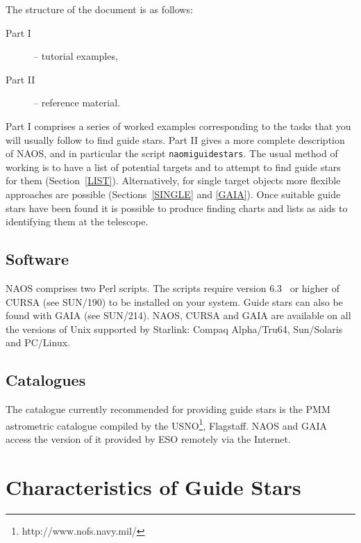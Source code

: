 \documentclass[twoside,11pt]{article}
\newcommand{\CURSAversion}{6.3~}
\newcommand{\htmladdnormallinkfoot}[2]{#1\footnote{#2}}
\newcommand{\xref}[3]{#1}
\newcommand{\xlabel}[1]{}
\renewcommand{\_}{\texttt{\symbol{95}}}
\begin{document}
The structure of the document is as follows:

\begin{description}

  \item[{\rm Part I}] -- tutorial examples,

  \item[{\rm Part II}] -- reference material.

\end{description}

Part I comprises a series of worked examples corresponding to the
tasks that you will usually follow to find guide stars.  Part II gives
a more complete description of NAOS, and in particular the script
{\tt naomiguidestars}.  
The usual method of working is to have a list of potential targets and
to attempt to find guide stars for them (Section~\ref{LIST}).
Alternatively, for single target objects more flexible approaches
are possible (Sections~\ref{SINGLE} and \ref{GAIA}).  Once suitable guide
stars have been found it is possible to produce finding charts and lists
as aids to identifying them at the telescope.

\subsection{Software}

NAOS comprises two Perl scripts.  The scripts require version \CURSAversion
or higher of CURSA (see \xref{SUN/190}{sun190}{}\cite{SUN190}) to be
installed on your system.  Guide stars can also be found with GAIA (see
\xref{SUN/214}{sun214}{}\cite{SUN214}).  NAOS, CURSA and GAIA are available
on all the versions of Unix supported by Starlink: Compaq Alpha/Tru64,
Sun/Solaris and PC/Linux.

\subsection{\label{CATALOG}Catalogues}

The catalogue currently recommended for providing guide stars is the
PMM astrometric catalogue compiled by the 
\htmladdnormallinkfoot{USNO}{http://www.nofs.navy.mil/}, Flagstaff\cite{PMM}.  
NAOS and GAIA access the version of it provided by ESO remotely via the
Internet.

\section{\xlabel{CHARACT}\label{CHARACT}Characteristics of Guide Stars}
\end{document}
